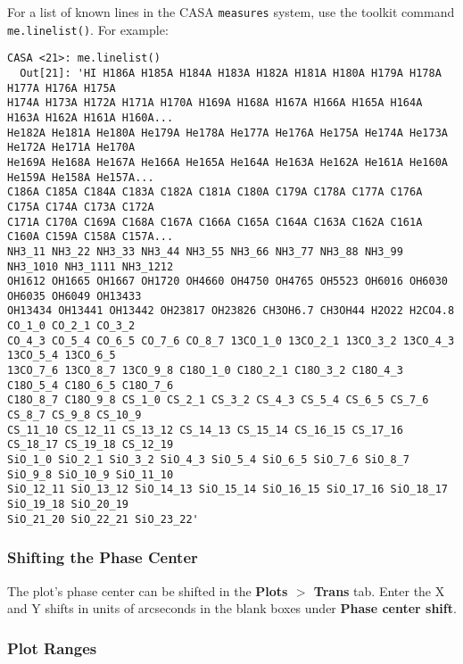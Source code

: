 For a list of known lines in the CASA {\tt measures} system, use the toolkit command {\tt me.linelist()}.  For example:
\small
\begin{verbatim}
CASA <21>: me.linelist()
  Out[21]: 'HI H186A H185A H184A H183A H182A H181A H180A H179A H178A H177A H176A H175A 
H174A H173A H172A H171A H170A H169A H168A H167A H166A H165A H164A H163A H162A H161A H160A... 
He182A He181A He180A He179A He178A He177A He176A He175A He174A He173A He172A He171A He170A 
He169A He168A He167A He166A He165A He164A He163A He162A He161A He160A He159A He158A He157A...
C186A C185A C184A C183A C182A C181A C180A C179A C178A C177A C176A C175A C174A C173A C172A 
C171A C170A C169A C168A C167A C166A C165A C164A C163A C162A C161A C160A C159A C158A C157A... 
NH3_11 NH3_22 NH3_33 NH3_44 NH3_55 NH3_66 NH3_77 NH3_88 NH3_99 NH3_1010 NH3_1111 NH3_1212 
OH1612 OH1665 OH1667 OH1720 OH4660 OH4750 OH4765 OH5523 OH6016 OH6030 OH6035 OH6049 OH13433 
OH13434 OH13441 OH13442 OH23817 OH23826 CH3OH6.7 CH3OH44 H2O22 H2CO4.8 CO_1_0 CO_2_1 CO_3_2 
CO_4_3 CO_5_4 CO_6_5 CO_7_6 CO_8_7 13CO_1_0 13CO_2_1 13CO_3_2 13CO_4_3 13CO_5_4 13CO_6_5 
13CO_7_6 13CO_8_7 13CO_9_8 C18O_1_0 C18O_2_1 C18O_3_2 C18O_4_3 C18O_5_4 C18O_6_5 C18O_7_6 
C18O_8_7 C18O_9_8 CS_1_0 CS_2_1 CS_3_2 CS_4_3 CS_5_4 CS_6_5 CS_7_6 CS_8_7 CS_9_8 CS_10_9 
CS_11_10 CS_12_11 CS_13_12 CS_14_13 CS_15_14 CS_16_15 CS_17_16 CS_18_17 CS_19_18 CS_12_19 
SiO_1_0 SiO_2_1 SiO_3_2 SiO_4_3 SiO_5_4 SiO_6_5 SiO_7_6 SiO_8_7 SiO_9_8 SiO_10_9 SiO_11_10 
SiO_12_11 SiO_13_12 SiO_14_13 SiO_15_14 SiO_16_15 SiO_17_16 SiO_18_17 SiO_19_18 SiO_20_19 
SiO_21_20 SiO_22_21 SiO_23_22'
\end{verbatim}
\normalsize


\subsubsection{Shifting the Phase Center}
\label{section:edit.plot.plotms.phcen}

The plot's phase center can be shifted in the {\bf Plots $>$ Trans}
tab. Enter the X and Y shifts in units of arcseconds in the blank
boxes under {\bf Phase center shift}.


\subsubsection{Plot Ranges}
\label{section:edit.plot.plotms.range}

